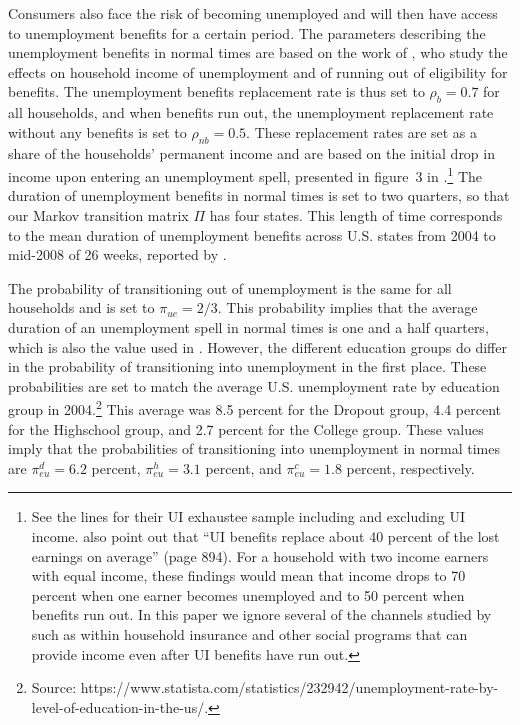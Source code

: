\documentclass[\econtexRoot/HAFiscal]{subfiles}
\begin{document}
Consumers also face the risk of becoming unemployed and will then have access to unemployment benefits for a certain period. The parameters describing the unemployment benefits in normal times are based on the work of \cite{rothstein2017scraping}, who study the effects on household income of unemployment and of running out of eligibility for benefits. The unemployment benefits replacement rate is thus set to $\rho_b=0.7$ for all households, and when benefits run out, the unemployment replacement rate without any benefits is set to $\rho_{nb}=0.5$. These replacement rates are set as a share of the households' permanent income and are based on the initial drop in income upon entering an unemployment spell, presented in figure~3 in \cite{rothstein2017scraping}.\footnote{See the lines for their UI exhaustee sample including and excluding UI income. \cite{rothstein2017scraping} also point out that ``UI benefits replace about 40 percent of the lost earnings on average'' (page 894). For a household with two income earners with equal income, these findings would mean that income drops to 70 percent when one earner becomes unemployed and to 50 percent when benefits run out. In this paper we ignore several of the channels studied by \cite{rothstein2017scraping} such as within household insurance and other social programs that can provide income even after UI benefits have run out.} The duration of unemployment benefits in normal times is set to two quarters, so that our Markov transition matrix $\Pi$ has four states. This length of time corresponds to the mean duration of unemployment benefits across U.S. states from 2004 to mid-2008 of 26 weeks, reported by \cite{rothstein2017scraping}. 

The probability of transitioning out of unemployment is the same for all households and is set to $\pi_{ue}=2/3$. This probability implies that the average duration of an unemployment spell in normal times is one and a half quarters, which is also the value used in \cite{carroll2020modeling}. However, the different education groups do differ in the probability of transitioning into unemployment in the first place. These probabilities are set to match the average U.S. unemployment rate by education group in 2004.\footnote{Source: https://www.statista.com/statistics/232942/unemployment-rate-by-level-of-education-in-the-us/.} This average was 8.5 percent for the Dropout group, 4.4 percent for the Highschool group, and 2.7 percent for the College group. These values imply that the probabilities of transitioning into unemployment in normal times are $\pi_{eu}^d=6.2$ percent, $\pi_{eu}^h=3.1$ percent, and $\pi_{eu}^c=1.8$ percent, respectively. 
\end{document}
